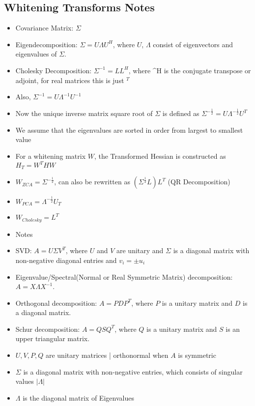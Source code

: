 \subsection{Whitening Transforms Notes}

\begin{itemize}

\item Covariance Matrix: $\Sigma$
\item Eigendecomposition: $\Sigma = U\Lambda U^{H}$, where $U$,  $\Lambda$ consist of eigenvectors and eigenvalues of $\Sigma$.
\item Cholesky Decomposition: $\Sigma^{-1} = LL^{H}$, where ^{H} is the conjugate transpose or adjoint, for real matrices this is just $^{T}$
\item Also, $\Sigma^{-1} = U \Lambda^{-1} U^{-1}$
\item Now the unique inverse matrix square root of $\Sigma$ is defined as  $\Sigma^{−\frac{1}{2}} = U\Lambda^{-\frac{1}{2}}U^{T}$
\item We assume that the eigenvalues are sorted in order from largest to smallest value
\item For a whitening matrix $W$, the Transformed Hessian is constructed as $H_{T} = W^{T}HW$
\item $W_{ZCA} = \Sigma^{−\frac{1}{2}}$, can also be rewritten as $(\Sigma^{\frac{1}{2}} L) L^{T}$ (QR Decomposition)
\item $W_{PCA} = \Lambda^{-\frac{1}{2}}U_{T}$
\item $W_{Cholesky} = L^{T}$
\item Notes
\item SVD: $A=U \Sigma V^T$, where $U$ and $V$ are unitary and $\Sigma$ is a diagonal matrix with non-negative diagonal entries and $v_i= \pm u_i$
\item Eigenvalue/Spectral(Normal or Real Symmetric Matrix) decomposition: $A=X \Lambda X^{-1}$.
\item Orthogonal decomposition: $A=P D P^T$, where $P$ is a unitary matrix and $D$ is a diagonal matrix.
\item Schur decomposition: $A=Q S Q^T$, where $Q$ is a unitary matrix and $S$ is an upper triangular matrix.
\item $U, V, P, Q$ are unitary matrices | orthonormal when $A$ is symmetric
\item $\Sigma$ is a diagonal matrix with non-negative entries, which consists of singular values $|\Lambda|$ 
\item $\Lambda$ is the diagonal matrix of Eigenvalues

\end{itemize}
